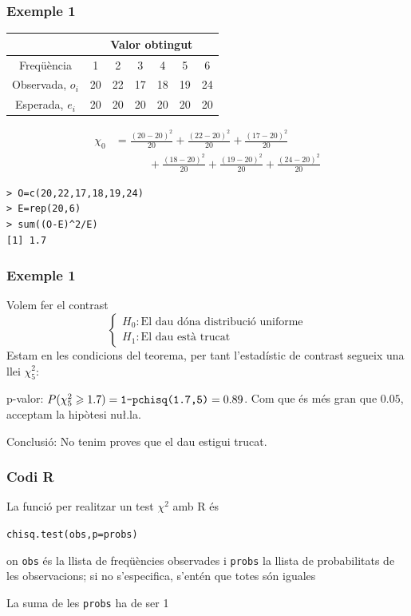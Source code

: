 \documentclass[12pt,t]{beamer}
\renewcommand{\emph}[1]{{\color{red}#1}}
\renewcommand{\geq}{\geqslant}
\theoremstyle{plain}
\theoremstyle{definition}
\begin{document}
\begin{frame}[fragile]
\frametitle{Exemple 1}
\vspace*{-2ex}

\begin{center}
\small \begin{tabular}{|c|cccccc|}\cline{2-7}
\multicolumn{1}{c}{} & \multicolumn{6}{|c|}{Valor obtingut}\\
\hline
Freqüència &1 & 2 & 3 & 4 & 5 & 6\\
\hline
Observada, $o_{i}$ & 20 & 22 & 17 & 18 & 19 & 24\\
Esperada, $e_{i}$& 20 & 20 & 20 & 20 & 20 &
20\\
\hline
\end{tabular}
\end{center}
$$
\begin{array}{rl}
 \chi_0& \displaystyle=\frac{(20-20)^2}{20}+\frac{(22-20)^2}{20}+ \frac{(17-20)^2}{20}
\\[2ex]
& \qquad\quad \displaystyle 
+
\frac{(18-20)^2}{20}+\frac{(19-20)^2}{20}+\frac{(24-20)^2}{20}
\end{array}
$$
\begin{verbatim}
> O=c(20,22,17,18,19,24)
> E=rep(20,6)
> sum((O-E)^2/E)
[1] 1.7
\end{verbatim}
\end{frame}

\begin{frame}
\frametitle{Exemple 1}
Volem fer el contrast
$$\left\{\begin{array}{l}
H_{0}: \mbox{El dau dóna distribució uniforme}\\
H_{1}: \mbox{El dau està trucat}
\end{array}
\right.
$$
Estam en les condicions del teorema, per tant l'estadístic de contrast segueix una llei $\chi^2_5$:
\bigskip

\emph{p-valor}: $P(\chi_5^2\geq 1.7)=\mbox{\texttt{1-pchisq(1.7,5)}}=0.89$. Com que és més gran que $0.05$, acceptam la hipòtesi nu\l.la.
\bigskip

\emph{Conclusió:} No tenim proves que el dau estigui trucat.
\end{frame}

\begin{frame}
\frametitle{Codi R}

La funció per realitzar un test $\chi^2$ amb R és
\begin{center}
\texttt{chisq.test(obs,p=probs)}
\end{center}
on \texttt{obs} és la llista de freqüències observades i \texttt{probs} la llista de \emph{probabilitats} de les observacions; si no s'especifica, s'entén que totes són iguales
\medskip

\emph{La suma de les \texttt{probs} ha de ser 1}
\end{frame}
\end{document}
